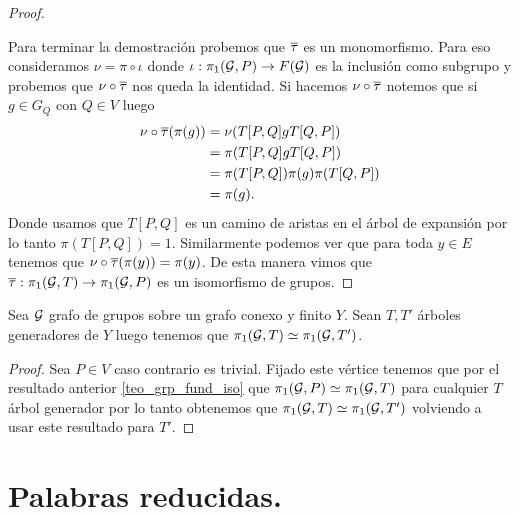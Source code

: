 \documentclass[tesis.tex]{subfiles}
\begin{document}
\begin{proof}
	\begin{center}
	\end{center}
	
	Para terminar la demostración probemos que $\overline \tau$ es un monomorfismo.
	Para eso consideramos $\nu = \pi \circ \iota$ donde $\iota: \pi_1({\cal G},P) \to F({\cal G})$ es la inclusión como subgrupo y probemos que $\nu \circ \overline \tau$ nos queda la identidad.
	Si hacemos $\nu \circ \overline \tau$ notemos que si $g \in G_Q$ con $Q \in V$ luego
	\begin{align*}
		\nu \circ \overline \tau (\pi (g)) & = \nu (T[P,Q]gT[Q,P]) \\
					&= \pi(T[P,Q]gT[Q,P]) \\
					&= \pi(T[P,Q]) \pi (g) \pi (T[Q,P]) \\
					&= \pi(g).
	\end{align*}
	Donde usamos que $T[P,Q]$ es un camino de aristas en el árbol de expansión por lo tanto $\pi(T[P,Q]) = 1$. 
	Similarmente podemos ver que para toda $y \in E$ tenemos que $\nu \circ \overline \tau (\pi(y)) = \pi(y)$.
	De esta manera vimos que $\overline \tau : \pi_{1}({\cal G},T) \to \pi_{1}({\cal G},P)$ es un isomorfismo de grupos.
\end{proof}

\begin{coro}
	Sea ${\cal G}$ grafo de grupos sobre un grafo conexo y finito $Y$.
	Sean $T, T'$ árboles generadores de $Y$ luego tenemos que $\pi_1({\cal G},T) \simeq \pi_1({\cal G},T')$.
\end{coro}
\begin{proof}
	Sea $P \in V$ caso contrario es trivial.
	Fijado este vértice tenemos que por el resultado anterior \ref{teo_grp_fund_iso} que $\pi_1({\cal G},P) \simeq \pi_1({\cal G},T)$ para cualquier $T$ árbol generador por lo tanto obtenemos que $\pi_1({\cal G}, T) \simeq \pi_1({\cal G},T')$ volviendo a usar este resultado para $T'$.
\end{proof}

\section{Palabras reducidas.}\label{secc_palab_reds}
\end{document}
